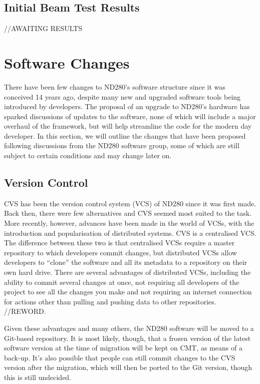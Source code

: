 \documentclass[aps,pra,12pt,notitlepage,tightenlines]{revtex4-1}
\begin{document}
\subsection{Initial Beam Test Results}
//AWAITING RESULTS

\section{Software Changes}
There have been few changes to ND280's software structure since it was conceived 14 years ago, despite many new and upgraded software tools being introduced by developers. The proposal of an upgrade to ND280's hardware has sparked discussions of updates to the software, none of which will include a major overhaul of the framework, but will help streamline the code for the modern day developer. In this section, we will outline the changes that have been proposed following discussions from the ND280 software group, some of which are still subject to certain conditions and may change later on.

\subsection{Version Control}
CVS has been the version control system (VCS) of ND280 since it was first made. Back then, there were few alternatives and CVS seemed most suited to the task. More recently, however, advances have been made in the world of VCSs, with the introduction and popularisation of distributed systems. CVS is a centralised VCS. The difference between these two is that centralised VCSs require a master repository to which developers commit changes, but distributed VCSs allow developers to ``clone'' the software and all its metadata to a repository on their own hard drive. There are several advantages of distributed VCSs, including the ability to commit several changes at once, not requiring all developers of the project to see all the changes you make and not requiring an internet connection for actions other than pulling and pushing data to other repositories. //REWORD.

Given these advantages and many others, the ND280 software will be moved to a Git-based repository. It is most likely, though, that a frozen version of the latest software version at the time of migration will be kept on CMT, as means of a back-up. It's also possible that people can still commit changes to the CVS version after the migration, which will then be ported to the Git version, though this is still undecided.
\end{document}
